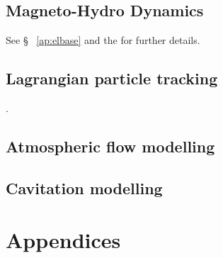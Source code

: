 \documentclass[a4paper,10pt,twoside]{csdoc}
\newcounter{prog}[part]
\begin{document}
\chapter{Magneto-Hydro Dynamics}
See \S~ \ref{ap:elbase} and the
 for further
details.

\chapter{Lagrangian particle tracking}
.


\chapter{Atmospheric flow modelling}




\chapter{Cavitation modelling}

%
\appendix

\part{Appendices}
\setcounter{section}{0}
\setcounter{equation}{0}
\setcounter{figure}{0}

\end{document}
